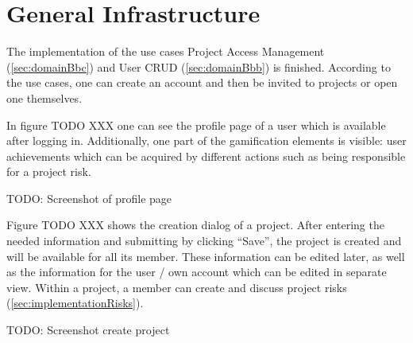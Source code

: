 \section{General Infrastructure}
\label{sec:implementationInfra}

The implementation of the use cases Project Access Management (\ref{sec:domainBbc}) and User CRUD (\ref{sec:domainBbb}) is finished. According to the use cases, one can create an account and then be invited to projects or open one themselves. 

In figure TODO XXX one can see the profile page of a user which is available after logging in. Additionally, one part of the gamification elements is visible: user achievements which can be acquired by different actions such as being responsible for a project risk.

TODO: Screenshot of profile page

Figure TODO XXX shows the creation dialog of a project. After entering the needed information and submitting by clicking “Save”, the project is created and will be available for all its member. These information can be edited later, as well as the information for the user / own account which can be edited in separate view. Within a project, a member can create and discuss project risks (\ref{sec:implementationRisks}).

TODO: Screenshot create project


